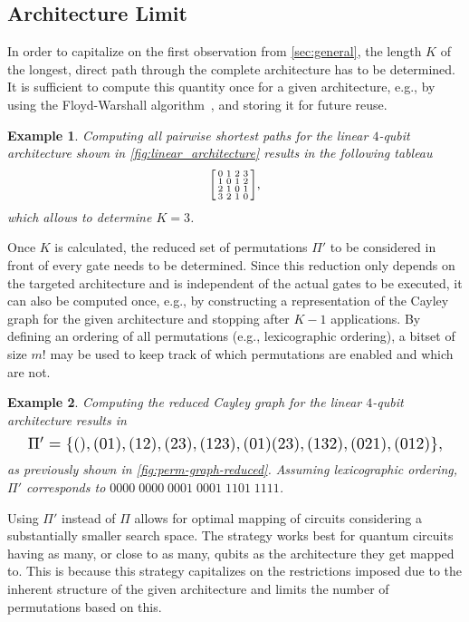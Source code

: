 \documentclass[10pt,conference]{IEEEtran}
\newtheorem{example}{Example}
\begin{document}
\subsection{Architecture Limit}\label{sec:ideaA}
In order to capitalize on the first observation from \autoref{sec:general}, the length $K$ of the longest, direct path through the complete architecture has to be determined.
It is sufficient to compute this quantity once for a given architecture, e.g., by using the Floyd-Warshall algorithm~\cite{cormenIntroductionAlgorithmsThird2009}, and storing it for future reuse.

\begin{example}\label{ex:floyd}
	Computing all pairwise shortest paths for the linear $4$-qubit architecture shown in \autoref{fig:linear_architecture} results in the following tableau
	\[
	\begin{bsmallmatrix}
		0 & 1 & 2 & 3 \\
		 1 & 0 & 1 & 2 \\
		 2 & 1 & 0 & 1\\
		 3 & 2 & 1 & 0		
	\end{bsmallmatrix},
	\]
	which allows to determine $K=3$.
\end{example}

Once $K$ is calculated, the reduced set of permutations $\Pi'$ to be considered in front of every gate needs to be determined. 
Since this reduction only depends on the targeted architecture and is independent of the actual gates to be executed, it can also be computed once, e.g., by constructing a representation of the Cayley graph for the given architecture and stopping after $K-1$ applications.
By defining an ordering of all permutations (e.g., lexicographic ordering), a bitset of size $m!$ may be used to keep track of which permutations are enabled and which are not.

\begin{example}
	Computing the reduced Cayley graph for the linear $4$-qubit architecture results in
	\[\resizebox{0.95\linewidth}{!}{$\Pi'=\{(), (01), (12), (23), (123), (01)(23), (132), (021), (012)\},$}\]
	as previously shown in \autoref{fig:perm-graph-reduced}.
	Assuming lexicographic ordering, $\Pi'$ corresponds to $0000\; 0000\; 0001\; 0001\; 1101\; 1111$.
\end{example}

Using $\Pi'$ instead of $\Pi$ allows for optimal mapping of circuits considering a substantially smaller search space.
The strategy works best for quantum circuits having as many, or close to as many, qubits as the architecture they get mapped to. This is because this strategy capitalizes on the restrictions imposed due to the inherent structure of the given architecture and limits the number of permutations based on this. 
\end{document}
